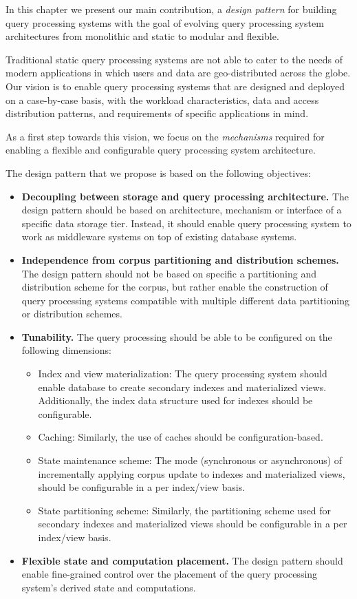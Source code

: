 
In this chapter we present our main contribution,
a \textit{design pattern} for building query processing systems with the goal of evolving query processing
system architectures from monolithic and static to modular and flexible.

Traditional static query processing systems are not able to cater to the needs of modern applications in which users and
data are geo-distributed across the globe.
Our vision is to enable query processing systems that are designed and deployed on a case-by-case basis,
with the workload characteristics, data and access distribution patterns, and requirements of specific applications in
mind.

As a first step towards this vision, we focus on the \textit{mechanisms} required for enabling a flexible and configurable
query processing system architecture.

The design pattern that we propose is based on the following objectives:
\begin{itemize}
  \item \textbf{Decoupling between storage and query processing architecture.}
  The design pattern should be based on architecture, mechanism or interface of a specific data storage tier.
  Instead, it should enable query processing system to work as middleware systems on top of existing database systems.

  \item \textbf{Independence from corpus partitioning and distribution schemes.}
  The design pattern should not be based on specific a partitioning and distribution scheme for the corpus,
  but rather enable the construction of query processing systems compatible with multiple different
  data partitioning or distribution schemes.

  \item \textbf{Tunability.}
  The query processing should be able to be configured on the following dimensions:
  \begin{itemize}
    \item Index and view materialization:
    The query processing system should enable database to create secondary indexes and materialized views.
    Additionally, the index data structure used for indexes should be configurable.
    \item Caching:
    Similarly, the use of caches should be configuration-based.
    \item State maintenance scheme:
    The mode (synchronous or asynchronous) of incrementally applying corpus update to indexes and materialized views,
    should be configurable in a per index/view basis.
    \item State partitioning scheme:
    Similarly, the partitioning scheme used for secondary indexes and materialized views should be configurable in a per
    index/view basis.
  \end{itemize}

  \item \textbf{Flexible state and computation placement.}
  The design pattern should enable fine-grained control over the placement of the query processing system's derived state
  and computations.

\end{itemize}

